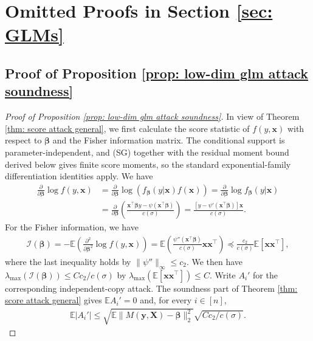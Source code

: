 \documentclass[letterpaper,12pt]{article}
\numberwithin{equation}{section}
\theoremstyle{plain}
\numberwithin{Theorem}{section}
\numberwithin{proposition}{section}
\numberwithin{Lemma}{section}
{
	\theoremstyle{definition}
	\newtheorem{Definition}{Definition}
	\newtheorem{example}{Example}
	\numberwithin{example}{section}
	\newtheorem{fact}{Fact}
	\numberwithin{fact}{section}
	\newtheorem{remark}{Remark}
}
\newcommand{\rev}[1]{#1}
\newcommand{\1}{\mathbbm{1}}
\def\bbeta{{\boldsymbol{\beta}}}
\def\E{\mathbb{E}}
\begin{document}
\section{Omitted Proofs in Section \ref{sec: GLMs}}\label{sec: glm proofs}
\subsection{Proof of Proposition \ref{prop: low-dim glm attack soundness}}\label{sec: proof of prop: low-dim glm attack soundness}

\begin{proof}[Proof of Proposition \ref{prop: low-dim glm attack soundness}]
		In view of Theorem \ref{thm: score attack general}, we first calculate the score statistic of $f(y, \bm x)$ with respect to $\bbeta$ and the Fisher information matrix. The conditional support is parameter-independent, and (SG) together with the residual moment bound derived below gives finite score moments, so the standard exponential-family differentiation identities apply. We have
	\begin{align*}
		\frac{\partial}{\partial \bbeta} \log f(y, \bm x) &= \frac{\partial}{\partial \bbeta} \log \left(f_\bbeta(y|\bm x) f(\bm x)\right) = \frac{\partial}{\partial \bbeta} \log f_\bbeta(y|\bm x) \\
		&= \frac{\partial}{\partial \bbeta}\left(\frac{\bm x^\top \bbeta y - \psi(\bm x^\top \bbeta)}{c(\sigma)}\right) = \frac{[y - \psi'(\bm x^\top \bbeta)]\bm x}{c(\sigma)}.
	\end{align*}
	For the Fisher information, we have
	\begin{align*}
		\mathcal I(\bbeta) = -\E \left(\frac{\partial^2}{\partial \bbeta^2} \log f(y, \bm x) \right) = \E\left(\frac{\psi''(\bm x^\top \bbeta)}{c(\sigma)} \bm x \bm x^\top\right) \preceq \frac{c_2}{c(\sigma)} \E[\bm x \bm x^\top],
	\end{align*}
	where the last inequality holds by $\|\psi''\|_\infty \leq c_2$. We then have $\lambda_{\max}(\mathcal I(\bbeta)) \leq Cc_2 /c(\sigma)$ by $\lambda_{\max}(\E[\bm x \bm x^\top]) \leq C$. \rev{Write $A_i'$ for the corresponding independent-copy attack. The soundness part of Theorem \ref{thm: score attack general} gives $\E A_i'=0$ and, for every $i\in[n]$,}
	{
	\begin{align*}
		\E|A_i'|
		\leq \sqrt{\E\|M(\bm y,\bm X)-\bbeta\|_2^2}
		\sqrt{Cc_2/c(\sigma)}.
	\end{align*}}
	

\end{proof}
\end{document}

